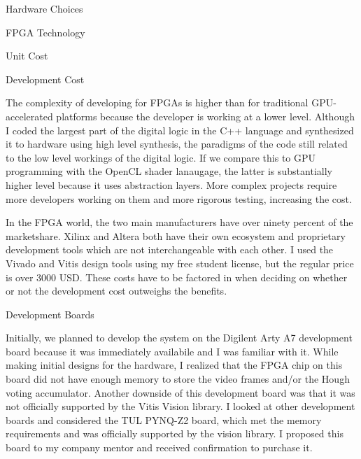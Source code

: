 \documentclass{matthijs}
\begin{document}
\begin{hoofdstuk}{Hardware Choices}
\begin{paragraaf}{FPGA Technology}
\begin{subparagraaf}{Unit Cost}
			\end{subparagraaf}

			\begin{subparagraaf}{Development Cost}

				The complexity of developing for FPGAs is higher than for traditional GPU-accelerated platforms because the developer is working at a lower level.
				Although I coded the largest part of the digital logic in the C++ language and synthesized it to hardware using high level synthesis, the paradigms of the code still related to the low level workings of the digital logic.
				If we compare this to GPU programming with the OpenCL shader lanaugage, the latter is substantially higher level because it uses abstraction layers.
				More complex projects require more developers working on them and more rigorous testing, increasing the cost.

				\bigskip

				In the FPGA world, the two main manufacturers have over ninety percent of the marketshare.
				Xilinx and Altera both have their own ecosystem and proprietary development tools which are not interchangeable with each other.
				I used the Vivado and Vitis design tools using my free student license, but the regular price is over 3000 USD.
				These costs have to be factored in when deciding on whether or not the development cost outweighs the benefits.

			\end{subparagraaf}

		\end{paragraaf}

		\begin{paragraaf}{Development Boards}

			Initially, we planned to develop the system on the Digilent Arty A7 development board because it was immediately availabile and I was familiar with it.
			While making initial designs for the hardware, I realized that the FPGA chip on this board did not have enough memory to store the video frames and/or the Hough voting accumulator.
			Another downside of this development board was that it was not officially supported by the Vitis Vision library.
			I looked at other development boards and considered the TUL PYNQ-Z2 board, which met the memory requirements and was officially supported by the vision library.
			I proposed this board to my company mentor and received confirmation to purchase it.

			\bigskip


\end{paragraaf}
\end{hoofdstuk}
\end{document}
